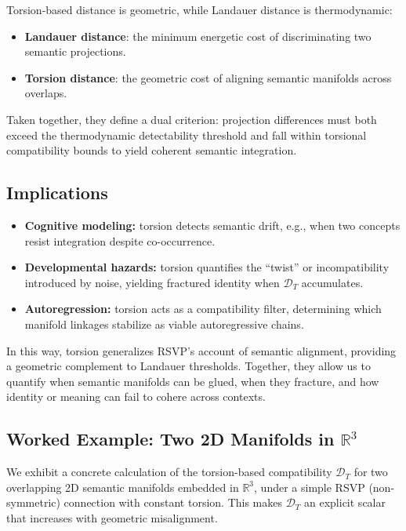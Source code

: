 \documentclass[a4paper,11pt]{article}
\begin{document}
Torsion-based distance is geometric, while Landauer distance is thermodynamic:
\begin{itemize}
    \item \textbf{Landauer distance}: the minimum energetic cost of
    discriminating two semantic projections.
    \item \textbf{Torsion distance}: the geometric cost of aligning semantic
    manifolds across overlaps.
\end{itemize}
Taken together, they define a dual criterion: projection differences must both
exceed the thermodynamic detectability threshold and fall within torsional
compatibility bounds to yield coherent semantic integration.

\subsection{Implications}

\begin{itemize}
    \item \textbf{Cognitive modeling:} torsion detects semantic drift, e.g.,
    when two concepts resist integration despite co-occurrence.
    \item \textbf{Developmental hazards:} torsion quantifies the ``twist'' or
    incompatibility introduced by noise, yielding fractured identity when
    $\mathcal{D}_T$ accumulates.
    \item \textbf{Autoregression:} torsion acts as a compatibility filter,
    determining which manifold linkages stabilize as viable autoregressive
    chains.
\end{itemize}

In this way, torsion generalizes RSVP’s account of semantic alignment,
providing a geometric complement to Landauer thresholds. Together, they allow
us to quantify when semantic manifolds can be glued, when they fracture, and
how identity or meaning can fail to cohere across contexts.

\subsection{Worked Example: Two 2D Manifolds in $\mathbb{R}^3$}
\label{sec:torsion-worked}

We exhibit a concrete calculation of the torsion-based compatibility
$\mathcal{D}_T$ for two overlapping 2D semantic manifolds embedded in
$\mathbb{R}^3$, under a simple RSVP (non-symmetric) connection with constant
torsion. This makes $\mathcal{D}_T$ an explicit scalar that increases with
geometric misalignment.
\end{document}

